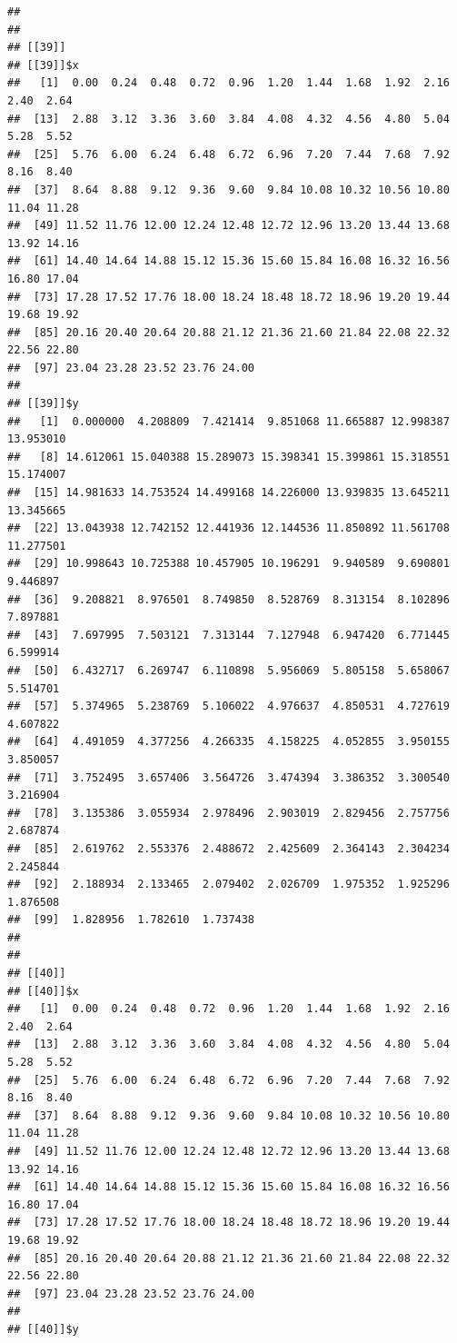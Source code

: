 \documentclass[
  ignorenonframetext,
]{beamer}
\begin{document}
\begin{frame}[fragile]{}
\begin{verbatim}
## 
## 
## [[39]]
## [[39]]$x
##   [1]  0.00  0.24  0.48  0.72  0.96  1.20  1.44  1.68  1.92  2.16  2.40  2.64
##  [13]  2.88  3.12  3.36  3.60  3.84  4.08  4.32  4.56  4.80  5.04  5.28  5.52
##  [25]  5.76  6.00  6.24  6.48  6.72  6.96  7.20  7.44  7.68  7.92  8.16  8.40
##  [37]  8.64  8.88  9.12  9.36  9.60  9.84 10.08 10.32 10.56 10.80 11.04 11.28
##  [49] 11.52 11.76 12.00 12.24 12.48 12.72 12.96 13.20 13.44 13.68 13.92 14.16
##  [61] 14.40 14.64 14.88 15.12 15.36 15.60 15.84 16.08 16.32 16.56 16.80 17.04
##  [73] 17.28 17.52 17.76 18.00 18.24 18.48 18.72 18.96 19.20 19.44 19.68 19.92
##  [85] 20.16 20.40 20.64 20.88 21.12 21.36 21.60 21.84 22.08 22.32 22.56 22.80
##  [97] 23.04 23.28 23.52 23.76 24.00
## 
## [[39]]$y
##   [1]  0.000000  4.208809  7.421414  9.851068 11.665887 12.998387 13.953010
##   [8] 14.612061 15.040388 15.289073 15.398341 15.399861 15.318551 15.174007
##  [15] 14.981633 14.753524 14.499168 14.226000 13.939835 13.645211 13.345665
##  [22] 13.043938 12.742152 12.441936 12.144536 11.850892 11.561708 11.277501
##  [29] 10.998643 10.725388 10.457905 10.196291  9.940589  9.690801  9.446897
##  [36]  9.208821  8.976501  8.749850  8.528769  8.313154  8.102896  7.897881
##  [43]  7.697995  7.503121  7.313144  7.127948  6.947420  6.771445  6.599914
##  [50]  6.432717  6.269747  6.110898  5.956069  5.805158  5.658067  5.514701
##  [57]  5.374965  5.238769  5.106022  4.976637  4.850531  4.727619  4.607822
##  [64]  4.491059  4.377256  4.266335  4.158225  4.052855  3.950155  3.850057
##  [71]  3.752495  3.657406  3.564726  3.474394  3.386352  3.300540  3.216904
##  [78]  3.135386  3.055934  2.978496  2.903019  2.829456  2.757756  2.687874
##  [85]  2.619762  2.553376  2.488672  2.425609  2.364143  2.304234  2.245844
##  [92]  2.188934  2.133465  2.079402  2.026709  1.975352  1.925296  1.876508
##  [99]  1.828956  1.782610  1.737438
## 
## 
## [[40]]
## [[40]]$x
##   [1]  0.00  0.24  0.48  0.72  0.96  1.20  1.44  1.68  1.92  2.16  2.40  2.64
##  [13]  2.88  3.12  3.36  3.60  3.84  4.08  4.32  4.56  4.80  5.04  5.28  5.52
##  [25]  5.76  6.00  6.24  6.48  6.72  6.96  7.20  7.44  7.68  7.92  8.16  8.40
##  [37]  8.64  8.88  9.12  9.36  9.60  9.84 10.08 10.32 10.56 10.80 11.04 11.28
##  [49] 11.52 11.76 12.00 12.24 12.48 12.72 12.96 13.20 13.44 13.68 13.92 14.16
##  [61] 14.40 14.64 14.88 15.12 15.36 15.60 15.84 16.08 16.32 16.56 16.80 17.04
##  [73] 17.28 17.52 17.76 18.00 18.24 18.48 18.72 18.96 19.20 19.44 19.68 19.92
##  [85] 20.16 20.40 20.64 20.88 21.12 21.36 21.60 21.84 22.08 22.32 22.56 22.80
##  [97] 23.04 23.28 23.52 23.76 24.00
## 
## [[40]]$y

\end{verbatim}
\end{frame}
\end{document}
